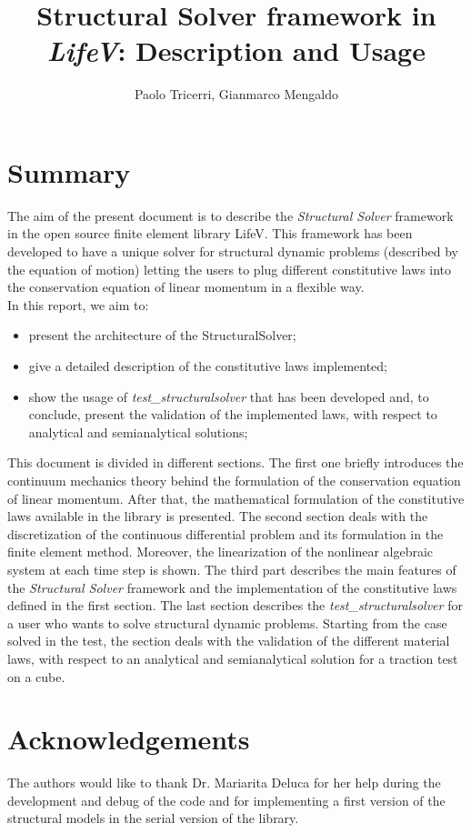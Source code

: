 \documentclass[a4paper, 10pt,twoside]{report}
\title{Structural Solver framework in \textit{LifeV}: Description and Usage}
\author{Paolo Tricerri, Gianmarco Mengaldo}
\theoremstyle{plain}
\theoremstyle{definition}
\theoremstyle{remark}
\newcommand{\SSol}{\textit{Structural Solver} }
\begin{document}
\maketitle


\section*{Summary}
The aim of the present document is to describe the \SSol framework in the open source finite element library LifeV. This framework has been developed to have a unique solver for structural dynamic problems (described by the equation of motion) letting the users to plug different constitutive laws into the conservation equation of linear momentum in a flexible way.\\
In this report, we aim to:
\begin{itemize}
  \item present the architecture of the StructuralSolver;
  \item give a detailed description of the constitutive laws implemented;
  \item show the usage of \textit{test\_structuralsolver} that has been developed and, to conclude, present the validation of the implemented laws, with respect to analytical and semianalytical solutions;
\end{itemize}
This document is divided in different sections. The first one briefly introduces the continuum mechanics theory behind the formulation of the conservation equation of linear momentum. After that, the mathematical formulation of the constitutive laws available in the library is presented. The second section deals with the discretization of the continuous differential problem and its formulation in the finite element method. Moreover, the linearization of the nonlinear algebraic system at each time step is shown. The third part describes the main features of the \SSol framework and the implementation of the constitutive laws defined in the first section. The last section describes the \textit{test\_structuralsolver} for a user who wants to solve structural dynamic problems. Starting from the case solved in the test, the section deals with the validation of the different material laws, with respect to an analytical and semianalytical solution for a traction test on a cube.\\

\section*{Acknowledgements}
The authors would like to thank Dr. Mariarita Deluca for her help during the development and debug of the code and for implementing a first version of the structural models in the serial version of the library.

\tableofcontents
\newpage









\end{document}
